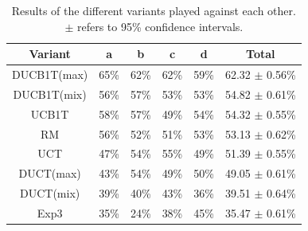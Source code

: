 \documentclass{article}
\begin{document}
\begin{table}[h!]
\scriptsize
\begin{minipage}{.51\textwidth}
\begin{tabular}{|c||c|c|c|c|c|}
									\hline
 Variant	& a 		  & b 		  & c 		  & d 		  & Total 	\\ \hline
 DUCB1T(max) & 65\% & 62\% & 62\% & 59\% & 62.32 $\pm$ 0.56\% \\ \hline
 DUCB1T(mix) & 56\% & 57\% & 53\% & 53\% & 54.82 $\pm$ 0.61\% \\ \hline
 UCB1T & 58\% & 57\% & 49\% & 54\% & 54.32 $\pm$ 0.55\% \\ \hline
        RM & 56\% & 52\% & 51\% & 53\% & 53.13 $\pm$ 0.62\% \\ \hline
   UCT & 47\% & 54\% & 55\% & 49\% & 51.39 $\pm$ 0.55\% \\ \hline
   DUCT(max) & 43\% & 54\% & 49\% & 50\% & 49.05 $\pm$ 0.61\% \\ \hline
   DUCT(mix) & 39\% & 40\% & 43\% & 36\% & 39.51 $\pm$ 0.64\% \\ \hline
      Exp3 & 35\% & 24\% & 38\% & 45\% & 35.47 $\pm$ 0.61\% \\ \hline
\end{tabular}
\caption{Results of the different variants played against each other. $\pm$ refers to 95\% confidence intervals. \label{tbl:overall-avgs}}
\end{minipage}
~~~~~
\begin{minipage}{.4\textwidth}
\scriptsize

\end{minipage}
\end{table}
\end{document}
